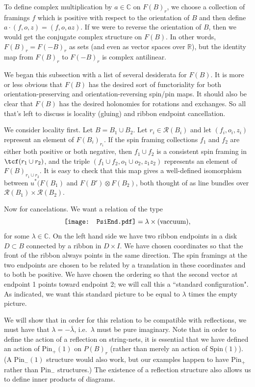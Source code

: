 \documentclass[12pt,a4paper]{article}
\newcommand{\cc}{\mathbb{C}}
\newcommand{\rr}{\mathbb{R}}
\newcommand{\mcr}{\mathcal{R}}
\newcommand\be            {\begin{equation}}
\newcommand\ee            {\end{equation}}
\newcommand{\spin}{\text{Spin}}
\newcommand{\pin}{\text{Pin}}
\newcommand{\PsiEnd}{\mathord{\vcenter{\hbox{\texttt{[image: PsiEnd.pdf]}}}}}
\begin{document}
To define complex multiplication by $a\in\cc$ on $F(B)_r$, we choose a collection of framings $f$ which is positive
with respect to the orientation of $B$ and then define $a\cdot (f, o, z) = (f, o, az)$.
If we were to reverse the orientation of $B$, then we would get the conjugate complex structure on $F(B)$.
In other words, $F(B)_r = F(-B)_r$ as sets (and even as vector spaces over $\rr$), but the identity map from
$F(B)_r$ to $F(-B)_r$ is complex antilinear.

\medskip

We began this subsection with a list of several desiderata for $F(B)$.
It is more or less obvious that $F(B)$ has the desired sort of functoriality for both orientation-preserving
and orientation-reversing spin/pin maps.
It should also be clear that $F(B)$ has the desired holonomies for rotations and exchanges.
So all that's left to discuss is locality (gluing) and ribbon endpoint cancellation.

\medskip

We consider locality first.
Let $B = B_1 \cup B_2$.
Let $r_i \in \mcr(B_i)$ and let $(f_i, o_i, z_i)$ represent an element of $F(B_i)_{r_i}$.
If the spin framing collections $f_1$ and $f_2$ are either both positive or both negative, then
$f_1 \cup f_2$ is a consistent spin framing in $\tcf(r_1 \cup r_2)$, and the triple
$(f_1 \cup f_2, o_1\cup o_2, z_1 z_2)$ represents an element of $F(B)_{r_1\cup r_2}$.
It is easy to check that this map gives a well-defined  isomorphism between $u^*(F(B_1)$ 
and $F(B')\otimes F(B_2)$, both thought of as line bundles over $\mcr(B_1)\times\mcr(B_2)$.

\medskip

Now for cancelations.
We want a relation of the type 
\be \label{eval_psi_semicirc}
\PsiEnd  = \lambda \times \text{(vaccuum)},
 \ee
for some $\lambda \in \cc$. 
On the left hand side we have two ribbon endpoints in a disk $D \subset B$ connected by a ribbon in $D\times I$.
We have chosen coordinates so that the front of the ribbon always points in the same direction.
The spin framings at the two endpoints are chosen to be related by a translation in these coordinates
and to both be positive.
We have chosen the ordering so that the second vector at endpoint 1 points toward endpoint 2;
we will call this a ``standard configuration".
As indicated, we want this standard picture to be equal to $\lambda$ times the empty picture.

We will show that in order for this relation to be compatible with reflections, 
we must have that $\lambda = -\bar\lambda$, i.e.\ $\lambda$ must be pure imaginary.
Note that in order to define the action of a reflection on string-nets, it is essential that we have defined an 
action of $\pin_+(1)$ on $P(B)_r$ (rather than merely an action of $\spin(1)$). 
(A $\pin_-(1)$ structure would also work, but our examples happen to have $\pin_+$ rather than $\pin_-$ structures.)
The existence of a reflection structure also allows us to define inner products of diagrams. 
\end{document}
